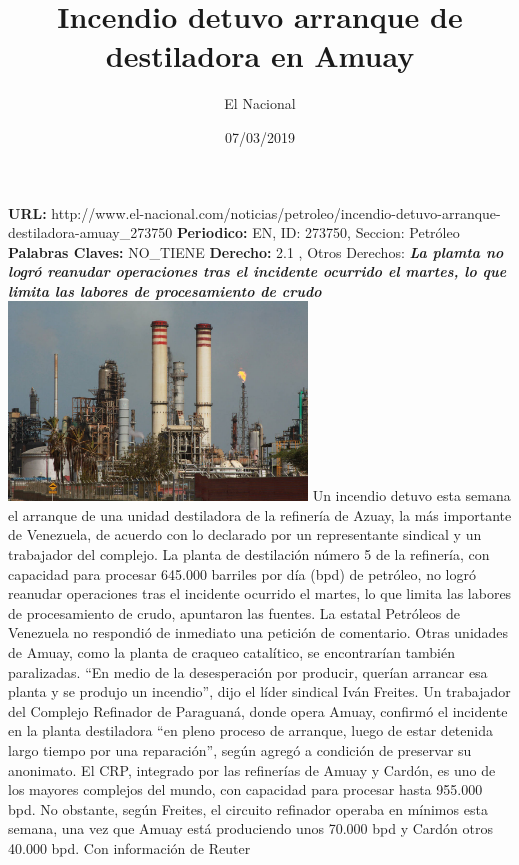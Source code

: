 \documentclass{article}%
\title{\textbf{Incendio detuvo arranque de destiladora en Amuay}}%
\author{El Nacional}%
\date{07/03/2019}%
\begin{document}
%
\normalsize%
\maketitle%
\textbf{URL: }%
http://www.el{-}nacional.com/noticias/petroleo/incendio{-}detuvo{-}arranque{-}destiladora{-}amuay\_273750\newline%
%
\textbf{Periodico: }%
EN, %
ID: %
273750, %
Seccion: %
Petróleo\newline%
%
\textbf{Palabras Claves: }%
NO\_TIENE\newline%
%
\textbf{Derecho: }%
2.1%
, Otros Derechos: %
\newline%
%
\textbf{\textit{La plamta no logró reanudar operaciones tras el incidente ocurrido el martes, lo que limita las labores de procesamiento de crudo}}%
\newline%
\newline%
%
\includegraphics[width=300px]{EN_273750.jpg}%
\newline%
%
Un incendio detuvo esta semana el arranque de una unidad destiladora de la refinería de Azuay, la más importante de Venezuela, de acuerdo con lo declarado por un representante sindical y un trabajador del complejo.%
\newline%
%
La planta de destilación número 5 de la refinería, con capacidad para procesar 645.000 barriles por día (bpd) de petróleo, no logró reanudar operaciones tras el incidente ocurrido el martes, lo que limita las labores de procesamiento de crudo, apuntaron las fuentes.%
\newline%
%
La estatal Petróleos de Venezuela no respondió de inmediato una petición de comentario. Otras unidades de Amuay, como la planta de craqueo catalítico, se encontrarían también paralizadas.%
\newline%
%
“En medio de la desesperación por producir, querían arrancar esa planta y se produjo un incendio”, dijo el líder sindical Iván Freites.%
\newline%
%
Un trabajador del Complejo Refinador de Paraguaná, donde opera Amuay, confirmó el incidente en la planta destiladora “en pleno proceso de arranque, luego de estar detenida largo tiempo por una reparación”, según agregó a condición de preservar su anonimato.%
\newline%
%
El CRP, integrado por las refinerías de Amuay y Cardón, es uno de los mayores complejos del mundo, con capacidad para procesar hasta 955.000 bpd.%
\newline%
%
No obstante, según Freites, el circuito refinador operaba en mínimos esta semana, una vez que Amuay está produciendo unos 70.000 bpd y Cardón otros 40.000 bpd.%
\newline%
%
Con información de Reuter%
\newline%
%
\end{document}
